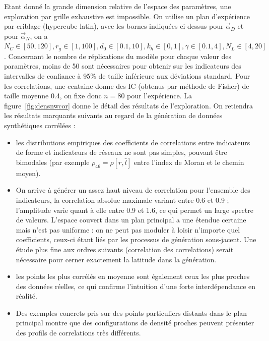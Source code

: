 Etant donné la grande dimension relative de l'espace des paramètres, une exploration par grille exhaustive est impossible. On utilise un plan d'expérience par criblage (hypercube latin), avec les bornes indiquées ci-dessus pour $\vec{\alpha}_D$ et pour $\vec{\alpha}_N$, on a $N_C \in [50,120], r_g \in [1,100] , d_0 \in [0.1,10] , k_h \in [0,1] , \gamma \in [0.1,4],N_L\in [4,20]$. Concernant le nombre de réplications du modèle pour chaque valeur des paramètres, moins de 50 sont nécessaires pour obtenir sur les indicateurs des intervalles de confiance à 95\% de taille inférieure aux déviations standard. Pour les correlations, une centaine donne des IC (obtenus par méthode de Fisher) de taille moyenne 0.4, on fixe donc $n=80$ pour l'expérience. La figure~\ref{fig:densnwcor} donne le détail des résultats de l'exploration. On retiendra les résultats marquants suivants au regard de la génération de données synthétiques corrélées :
\begin{itemize}
\item les distributions empiriques des coefficients de correlations entre indicateurs de forme et indicateurs de réseaux ne sont pas simples, pouvant être bimodales (par exemple $\rho_{46}=\rho[r,\bar{l}]$ entre l'index de Moran et le chemin moyen).
\item On arrive à générer un assez haut niveau de correlation pour l'ensemble des indicateurs, la correlation absolue maximale variant entre 0.6 et 0.9 ; l'amplitude varie quant à elle entre 0.9 et 1.6, ce qui permet un large spectre de valeurs. L'espace couvert dans un plan principal a une étendue certaine mais n'est pas uniforme : on ne peut pas moduler à loisir n'importe quel coefficients, ceux-ci étant liés par les processus de génération sous-jacent. Une étude plus fine aux ordres suivants (correlation des correlations) serait nécessaire pour cerner exactement la latitude dans la génération.
\item les points les plus corrélés en moyenne sont également ceux les plus proches des données réelles, ce qui confirme l'intuition d'une forte interdépendance en réalité.
\item Des exemples concrets pris sur des points particuliers distants dans le plan principal montre que des configurations de densité proches peuvent présenter des profils de correlations très différents.
\end{itemize}








